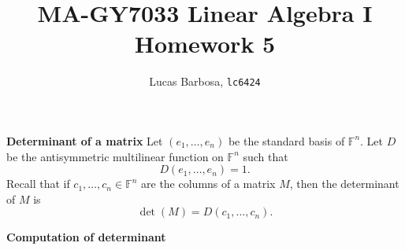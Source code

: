 \documentclass[nohyper,nobib,nofonts]{tufte-handout}
\title[MA-GY7033 Linear Algebra I, Homework 5]{MA-GY7033 Linear Algebra I\\Homework 5}
\author[Lucas Barbosa, lc6424]{Lucas Barbosa, \texttt{lc6424}}
\date{}
\theoremstyle{definition}
\begin{document}
\maketitle

\noindent\textbf{Determinant of a matrix}\quad
Let \((e_1,\ldots,e_n)\) be the standard basis of \(\mathbb F^n\).
Let \(D\) be the antisymmetric multilinear function on \(\mathbb F^n\)
such that
\[
  D(e_1,\ldots,e_n)=1.
\]
Recall that if \(c_1,\ldots,c_n\in\mathbb F^n\) are the columns of
a matrix \(M\), then the determinant of \(M\) is
\[
  \det(M)=D(c_1,\ldots,c_n).
\]

\noindent\textbf{Computation of determinant}\quad

























\end{document}
